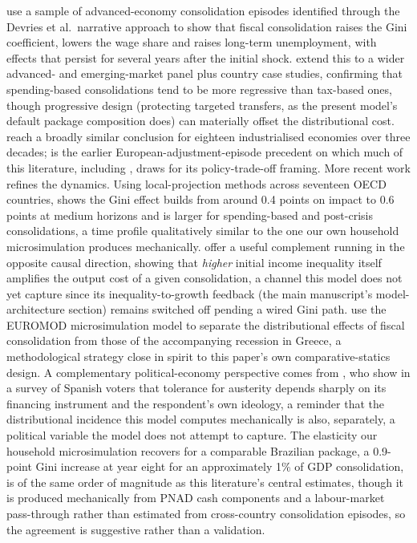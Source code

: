 \documentclass[11pt,a4paper]{article}
\begin{document}
\citet{ballfurcerilleighlloungani2013} use a sample of advanced-economy consolidation episodes identified through the Devries et al.\ narrative approach to show that fiscal consolidation raises the Gini coefficient, lowers the wage share and raises long-term unemployment, with effects that persist for several years after the initial shock. \citet{woobovakindazhang2017} extend this to a wider advanced- and emerging-market panel plus country case studies, confirming that spending-based consolidations tend to be more regressive than tax-based ones, though progressive design (protecting targeted transfers, as the present model's default package composition does) can materially offset the distributional cost. \citet{agnellosousa2014,agnellosousa2012b} reach a broadly similar conclusion for eighteen industrialised economies over three decades; \citet{mulasgranados2005,mulasgranados2006book} is the earlier European-adjustment-episode precedent on which much of this literature, including \citet{ballfurcerilleighlloungani2013}, draws for its policy-trade-off framing. More recent work refines the dynamics. Using local-projection methods across seventeen OECD countries, \citet{heimberger2020} shows the Gini effect builds from around 0.4 points on impact to 0.6 points at medium horizons and is larger for spending-based and post-crisis consolidations, a time profile qualitatively similar to the one our own household microsimulation produces mechanically. \citet{brincaetal2021} offer a useful complement running in the opposite causal direction, showing that \emph{higher} initial income inequality itself amplifies the output cost of a given consolidation, a channel this model does not yet capture since its inequality-to-growth feedback (the main manuscript's model-architecture section) remains switched off pending a wired Gini path. \citet{leventimatsaganis2013} use the EUROMOD microsimulation model to separate the distributional effects of fiscal consolidation from those of the accompanying recession in Greece, a methodological strategy close in spirit to this paper's own comparative-statics design. A complementary political-economy perspective comes from \citet{lagopenasetal2024}, who show in a survey of Spanish voters that tolerance for austerity depends sharply on its financing instrument and the respondent's own ideology, a reminder that the distributional incidence this model computes mechanically is also, separately, a political variable the model does not attempt to capture. The elasticity our household microsimulation recovers for a comparable Brazilian package, a 0.9-point Gini increase at year eight for an approximately 1\% of GDP consolidation, is of the same order of magnitude as this literature's central estimates, though it is produced mechanically from PNAD cash components and a labour-market pass-through rather than estimated from cross-country consolidation episodes, so the agreement is suggestive rather than a validation.
\end{document}
